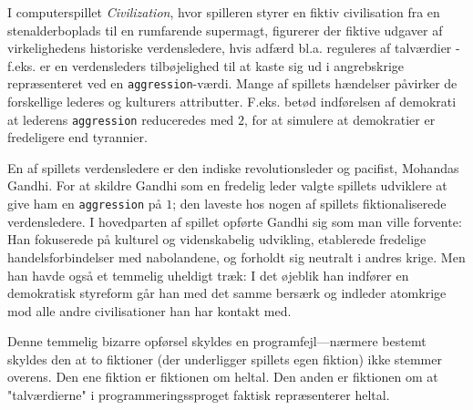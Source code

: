 I computerspillet \emph{Civilization}, hvor spilleren styrer en fiktiv civilisation fra en stenalderboplads til en rumfarende supermagt, figurerer der fiktive udgaver af virkelighedens historiske verdensledere, hvis adfærd bl.a. reguleres af talværdier - f.eks. er en verdensleders tilbøjelighed til at kaste sig ud i angrebskrige repræsenteret ved en \texttt{aggression}-værdi. Mange af spillets hændelser påvirker de forskellige lederes og kulturers attributter. F.eks. betød indførelsen af demokrati at lederens \texttt{aggression} reduceredes med $2$, for at simulere at demokratier er fredeligere end tyrannier.

En af spillets verdensledere er den indiske revolutionsleder og pacifist, Mohandas Gandhi. For at skildre Gandhi som en fredelig leder valgte spillets udviklere at give ham en \texttt{aggression} på $1$; den laveste hos nogen af spillets fiktionaliserede verdensledere. I hovedparten af spillet opførte Gandhi sig som man ville forvente: Han fokuserede på kulturel og videnskabelig udvikling, etablerede fredelige handelsforbindelser med nabolandene, og forholdt sig neutralt i andres krige. Men han havde også et temmelig uheldigt træk: I det øjeblik han indfører en demokratisk styreform går han med det samme bersærk og indleder atomkrige mod alle andre civilisationer han har kontakt med.

Denne temmelig bizarre opførsel skyldes en programfejl---nærmere bestemt skyldes den at to fiktioner (der underligger spillets egen fiktion) ikke stemmer overens. Den ene fiktion er fiktionen om heltal. Den anden er fiktionen om at "talværdierne" i programmeringssproget faktisk repræsenterer heltal.